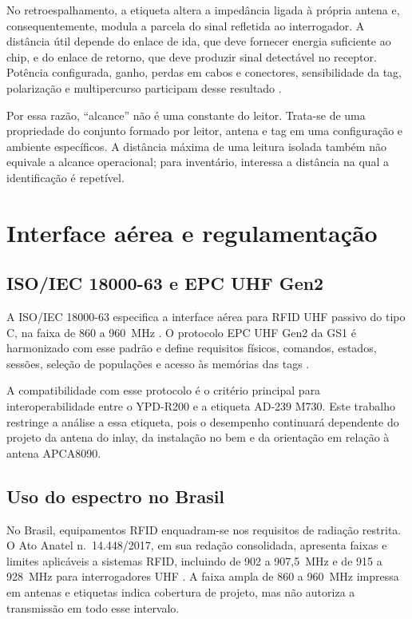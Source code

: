 No retroespalhamento, a etiqueta altera a impedância ligada à própria antena e, consequentemente, modula a parcela do sinal refletida ao interrogador. A distância útil depende do enlace de ida, que deve fornecer energia suficiente ao chip, e do enlace de retorno, que deve produzir sinal detectável no receptor. Potência configurada, ganho, perdas em cabos e conectores, sensibilidade da tag, polarização e multipercurso participam desse resultado \cite{wang2009uhf,thomas2012qam}.

Por essa razão, ``alcance'' não é uma constante do leitor. Trata-se de uma propriedade do conjunto formado por leitor, antena e tag em uma configuração e ambiente específicos. A distância máxima de uma leitura isolada também não equivale a alcance operacional; para inventário, interessa a distância na qual a identificação é repetível.

\section{Interface aérea e regulamentação}

\subsection{ISO/IEC 18000-63 e EPC UHF Gen2}

A ISO/IEC 18000-63 especifica a interface aérea para RFID UHF passivo do tipo C, na faixa de 860 a 960~MHz \cite{iso1800063}. O protocolo EPC UHF Gen2 da GS1 é harmonizado com esse padrão e define requisitos físicos, comandos, estados, sessões, seleção de populações e acesso às memórias das tags \cite{gs1gen2}.

A compatibilidade com esse protocolo é o critério principal para interoperabilidade entre o YPD-R200 e a etiqueta AD-239 M730. Este trabalho restringe a análise a essa etiqueta, pois o desempenho continuará dependente do projeto da antena do inlay, da instalação no bem e da orientação em relação à antena APCA8090.

\subsection{Uso do espectro no Brasil}

No Brasil, equipamentos RFID enquadram-se nos requisitos de radiação restrita. O Ato Anatel n.\ 14.448/2017, em sua redação consolidada, apresenta faixas e limites aplicáveis a sistemas RFID, incluindo de 902 a 907,5~MHz e de 915 a 928~MHz para interrogadores UHF \cite{anatelrfid}. A faixa ampla de 860 a 960~MHz impressa em antenas e etiquetas indica cobertura de projeto, mas não autoriza a transmissão em todo esse intervalo.

